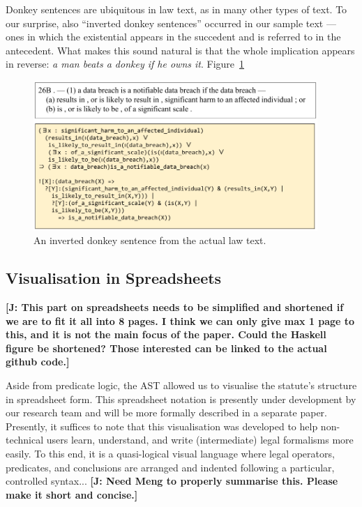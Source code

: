 \documentclass{IOS-Book-Article}
\newcommand{\todoj}[1]{{\color{red}\textbf{[J: #1]}}}
\begin{document}
Donkey sentences are ubiquitous in law text, as in many other types of text.
To our surprise, also ``inverted donkey sentences'' occurred in our sample text --- ones in which the existential appears in the succedent and is referred to in the antecedent.
What makes this sound natural is that the whole implication appears in reverse: \textit{a man beats a donkey if he owns it}.
Figure~\ref{donkey}

\begin{figure}
 \includegraphics[width=0.96\textwidth]{anaphora.png}
\caption{An inverted donkey sentence from the actual law text.}
\label{donkey}
\end{figure}

\subsection{Visualisation in Spreadsheets}

\todoj{This part on spreadsheets needs to be simplified and shortened if we are to fit it all into 8 pages. I think we can only give max 1 page to this, and it is not the main focus of the paper. Could the Haskell figure be shortened? Those interested can be linked to the actual github code.}

Aside from predicate logic, the AST allowed us to visualise the statute's structure in spreadsheet form. This spreadsheet notation is presently under development by our research team and will be more formally described in a separate paper. Presently, it suffices to note that this visualisation was developed to help non-technical users learn, understand, and write (intermediate) legal formalisms more easily. To this end, it is a quasi-logical visual language where legal operators, predicates, and conclusions are arranged and indented following a particular, controlled syntax...
\todoj{Need Meng to properly summarise this. Please make it short and concise.}
\end{document}
